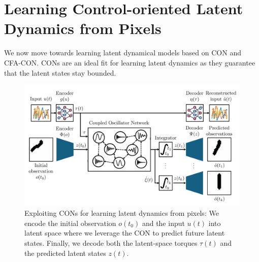 \section{Learning Control-oriented Latent Dynamics from Pixels}\label{sec:con:learning_latent_space_dynamics}
We now move towards learning latent dynamical models based on \gls{CON} and \gls{CFA-CON}.
\glspl{CON} are an ideal fit for learning latent dynamics as they guarantee that the latent states stay bounded. 

\begin{figure}[t]
    \centering
    \includegraphics[width=1.0\linewidth]{con/figures/autoencoder/blockdiagram_autoencoder_v1_cropped.pdf}
    \caption{Exploiting \glspl{CON} for learning latent dynamics from pixels: We encode the initial observation $o(t_0)$ and the input $u(t)$ into latent space where we leverage the \gls{CON} to predict future latent states. Finally, we decode both the latent-space torques $\tau(t)$ and the predicted latent states $z(t)$.}
    \label{fig:con:blockdiagram_autoencoder}
\end{figure}

